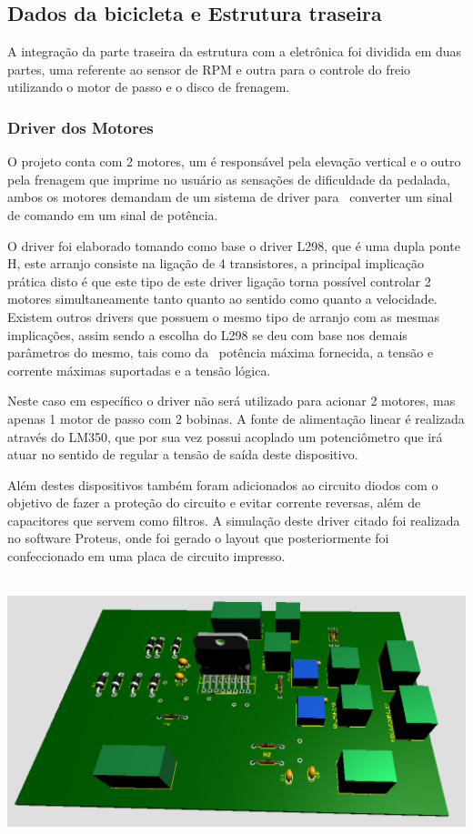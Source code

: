 \subsection{Dados da bicicleta e Estrutura traseira}
	A integração da parte traseira da estrutura com a eletrônica foi dividida em duas partes, uma referente ao sensor de RPM e outra para o controle do freio utilizando o motor de passo e o disco de frenagem.
    \subsubsection{Driver dos Motores}

    O projeto conta com 2 motores, um é responsável pela elevação vertical e o outro pela frenagem que imprime no usuário as sensações de dificuldade da pedalada, ambos os motores demandam de um sistema de driver para  converter um sinal de comando em um sinal de potência. 

    O driver foi elaborado tomando como base o driver L298, que é uma dupla ponte H, este arranjo consiste na ligação de 4 transistores, a principal implicação prática disto é que este tipo de este driver ligação torna possível controlar 2 motores simultaneamente tanto quanto ao sentido como quanto a velocidade. Existem outros drivers que possuem o mesmo tipo de arranjo com as mesmas implicações, assim sendo a escolha do L298 se deu com base nos demais parâmetros do mesmo, tais como da  potência máxima fornecida, a tensão e corrente máximas suportadas e a tensão lógica. 

    Neste caso em específico o driver não será utilizado para acionar 2 motores, mas apenas 1 motor de passo com 2 bobinas. A fonte de alimentação linear é realizada através do LM350, que por sua vez possui acoplado um potenciômetro que irá atuar no sentido de regular a tensão de saída deste dispositivo. 
    
    Além destes dispositivos também foram adicionados ao circuito diodos com o objetivo de fazer a proteção do circuito e evitar corrente reversas, além de capacitores que servem como filtros. A simulação deste driver citado foi realizada no software Proteus, onde foi gerado o layout que posteriormente foi confeccionado em uma placa de circuito impresso. 

        \begin{center}
            \includegraphics[scale=0.5]{figuras/driver3d}
               \label{driver3d}
          \end{center}  
